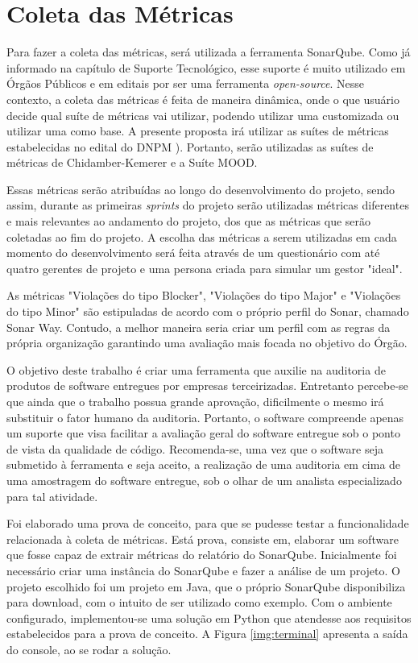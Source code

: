 \section{Coleta das Métricas}
Para fazer a coleta das métricas, será utilizada a ferramenta SonarQube. Como já informado na capítulo de Suporte Tecnológico, esse suporte é muito utilizado em Órgãos Públicos e em editais por ser uma ferramenta \textit{open-source}. Nesse contexto, a coleta das métricas é feita de maneira dinâmica, onde o que usuário decide qual suíte de métricas vai utilizar, podendo utilizar uma customizada ou utilizar uma como base. A presente proposta irá utilizar as suítes de métricas estabelecidas no edital do DNPM \cite{edital}). Portanto, serão utilizadas as suítes de métricas de Chidamber-Kemerer e a Suíte MOOD.

Essas métricas serão atribuídas ao longo do desenvolvimento do projeto, sendo assim, durante as primeiras \textit{sprints} do projeto serão utilizadas métricas diferentes e mais relevantes ao andamento do projeto, dos que as métricas que serão coletadas ao fim do projeto. A escolha das métricas a serem utilizadas em cada momento do desenvolvimento será feita através de um questionário com até quatro gerentes de projeto e uma persona criada para simular um gestor "ideal".

As métricas "Violações do tipo Blocker", "Violações do tipo Major" e "Violações do tipo Minor" são estipuladas de acordo com o próprio perfil do Sonar, chamado Sonar Way. Contudo, a melhor maneira seria criar um perfil com as regras da própria organização garantindo uma avaliação mais focada no objetivo do Órgão.


O objetivo deste trabalho é criar uma ferramenta que auxilie na auditoria de produtos de software entregues por empresas terceirizadas. Entretanto percebe-se que ainda que o trabalho possua grande aprovação, dificilmente o mesmo irá substituir o fator humano da auditoria. Portanto, o software compreende apenas um suporte que visa facilitar a avaliação geral do software entregue sob o ponto de vista da qualidade de código. Recomenda-se, uma vez que o software seja submetido à ferramenta e seja aceito, a realização de uma auditoria em cima de uma amostragem do software entregue, sob o olhar de um analista especializado para tal atividade.

Foi elaborado uma prova de conceito, para que se pudesse testar a funcionalidade relacionada à coleta de métricas. Está prova, consiste em, elaborar um software que fosse capaz de extrair métricas do relatório do SonarQube. Inicialmente foi necessário criar uma instância do SonarQube e fazer a análise de um projeto. O projeto escolhido foi um projeto em Java, que o próprio SonarQube disponibiliza para download, com o intuito de ser utilizado como exemplo. Com o ambiente configurado, implementou-se uma solução em Python que atendesse aos requisitos estabelecidos para a prova de conceito. A Figura \ref{img:terminal} apresenta a saída do console, ao se rodar a solução.


